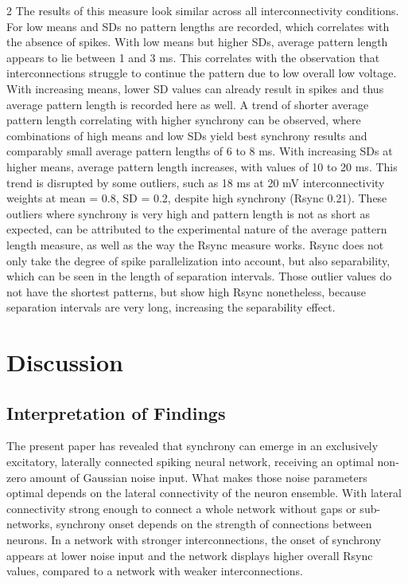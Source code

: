 \documentclass[12pt,a4paper]{article}
\begin{document}
\begin{multicols}{2}
            The results of this measure look similar across all interconnectivity conditions. For low means and SDs no pattern lengths are recorded, which correlates with the absence of spikes. With low means but higher SDs, average pattern length appears to lie between 1 and 3 ms. This correlates with the observation that interconnections struggle to continue the pattern due to low overall low voltage. With increasing means, lower SD values can already result in spikes and thus average pattern length is recorded here as well. A trend of shorter average pattern length correlating with higher synchrony can be observed, where combinations of high means and low SDs yield best synchrony results and comparably small average pattern lengths of 6 to 8 ms. With increasing SDs at higher means, average pattern length increases, with values of 10 to 20 ms. This trend is disrupted by some outliers, such as 18 ms at 20 mV interconnectivity weights at mean = 0.8, SD = 0.2, despite high synchrony (Rsync 0.21). These outliers where synchrony is very high and pattern length is not as short as expected, can be attributed to the experimental nature of the average pattern length measure, as well as the way the Rsync measure works. Rsync does not only take the degree of spike parallelization into account, but also separability, which can be seen in the length of separation intervals. Those outlier values do not have the shortest patterns, but show high Rsync nonetheless, because separation intervals are very long, increasing the separability effect.


        \section{Discussion}
        \subsection{Interpretation of Findings}
			The present paper has revealed that synchrony can emerge in an exclusively excitatory, laterally connected spiking neural network, receiving an optimal non-zero amount of Gaussian noise input. What makes those noise parameters optimal depends on the lateral connectivity of the neuron ensemble. With lateral connectivity strong enough to connect a whole network without gaps or sub-networks, synchrony onset depends on the strength of connections between neurons. In a network with stronger interconnections, the onset of synchrony appears at lower noise input and the network displays higher overall Rsync values, compared to a network with weaker interconnections.
            

\end{multicols}
\end{document}
